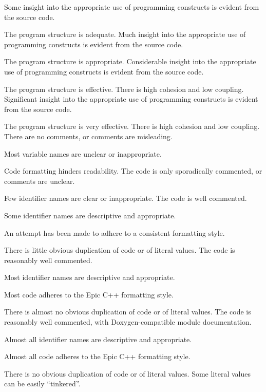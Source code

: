 \documentclass{../fal_assignment}
\begin{document}
\begin{markingrubric}
        \grade Some insight into the appropriate use of programming constructs is evident from the source code.
            \par The program structure is adequate.
        \grade Much insight into the appropriate use of programming constructs is evident from the source code.
            \par The program structure is appropriate.
        \grade Considerable insight into the appropriate use of programming constructs is evident from the source code.
            \par The program structure is effective. There is high cohesion and low coupling.
        \grade Significant insight into the appropriate use of programming constructs is evident from the source code.
            \par The program structure is very effective. There is high cohesion and low coupling.
%
        \grade\fail There are no comments, or comments are misleading.
            \par Most variable names are unclear or inappropriate.
            \par Code formatting hinders readability.
        \grade The code is only sporadically commented, or comments are unclear.
            \par Few identifier names are clear or inappropriate.
        \grade The code is well commented.
            \par Some identifier names are descriptive and appropriate.
            \par An attempt has been made to adhere to a consistent formatting style.
             \par There is little obvious duplication of code or of literal values.           
        \grade The code is reasonably well commented.
            \par Most identifier names are descriptive and appropriate.
            \par Most code adheres to the Epic C++ formatting style.
             \par There is almost no obvious duplication of code or of literal values.   
        \grade The code is reasonably well commented, with Doxygen-compatible module documentation.
            \par Almost all identifier names are descriptive and appropriate.
            \par Almost all code adheres to the Epic C++ formatting style.
             \par There is no obvious duplication of code or of literal values. Some literal values can be easily ``tinkered''. 

\end{markingrubric}
\end{document}
